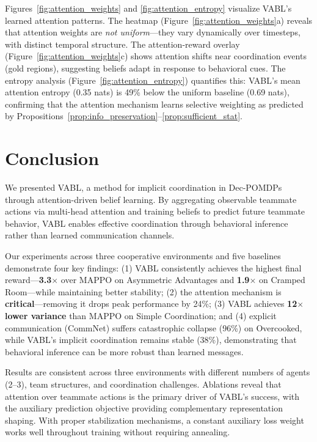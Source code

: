 \documentclass{article}
\theoremstyle{plain}
\theoremstyle{definition}
\theoremstyle{remark}
\begin{document}
Figures~\ref{fig:attention_weights} and \ref{fig:attention_entropy} visualize VABL's learned attention patterns. The heatmap (Figure~\ref{fig:attention_weights}a) reveals that attention weights are \emph{not uniform}---they vary dynamically over timesteps, with distinct temporal structure. The attention-reward overlay (Figure~\ref{fig:attention_weights}c) shows attention shifts near coordination events (gold regions), suggesting beliefs adapt in response to behavioral cues. The entropy analysis (Figure~\ref{fig:attention_entropy}) quantifies this: VABL's mean attention entropy (0.35 nats) is 49\% below the uniform baseline (0.69 nats), confirming that the attention mechanism learns selective weighting as predicted by Propositions~\ref{prop:info_preservation}--\ref{prop:sufficient_stat}.

\FloatBarrier

\section{Conclusion}

We presented VABL, a method for implicit coordination in Dec-POMDPs through attention-driven belief learning. By aggregating observable teammate actions via multi-head attention and training beliefs to predict future teammate behavior, VABL enables effective coordination through behavioral inference rather than learned communication channels.

Our experiments across three cooperative environments and five baselines demonstrate four key findings: (1) VABL consistently achieves the highest final reward---\textbf{3.3$\times$} over MAPPO on Asymmetric Advantages and \textbf{1.9$\times$} on Cramped Room---while maintaining better stability; (2) the attention mechanism is \textbf{critical}---removing it drops peak performance by 24\%; (3) VABL achieves \textbf{12$\times$ lower variance} than MAPPO on Simple Coordination; and (4) explicit communication (CommNet) suffers catastrophic collapse (96\%) on Overcooked, while VABL's implicit coordination remains stable (38\%), demonstrating that behavioral inference can be more robust than learned messages.

Results are consistent across three environments with different numbers of agents (2--3), team structures, and coordination challenges. Ablations reveal that attention over teammate actions is the primary driver of VABL's success, with the auxiliary prediction objective providing complementary representation shaping. With proper stabilization mechanisms, a constant auxiliary loss weight works well throughout training without requiring annealing.
\end{document}
